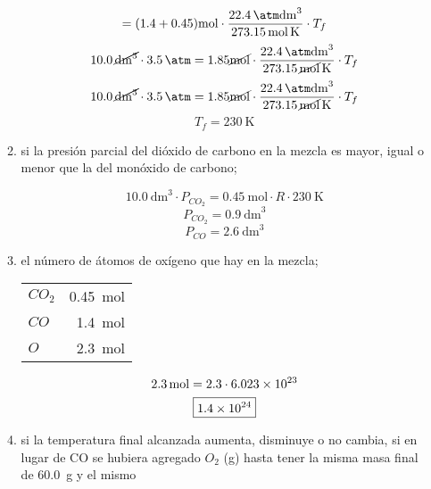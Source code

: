\documentclass[../practica.root.tex]{subfiles}
\begin{document}
\begin{enumerate}
\begin{enumerate}
\begin{center}
\[                            = (\num{1,4} + \num{0,45})\si{\mole}
                            \cdot\frac{\SI{22,4}{\atm\dm\cubed}}{\SI{273,15}{\mole\kelvin}}
                            \cdot T_f
                        \]
                        \[
                            \SI{10,0}{\cancel\dm\cubed}\cdot\SI{3,5}{\cancel\atm}
                            = \num{1,85}\si{\cancel\mole}
                            \cdot\frac{\SI{22,4}{\cancel\atm\cancel\dm\cubed}}{\SI{273,15}{\cancel\mole\kelvin}}
                            \cdot T_f
                        \]
                        \[
                            \SI{10,0}{\cancel\dm\cubed}\cdot\SI{3,5}{\cancel\atm}
                            = \num{1,85}\si{\cancel\mole}
                            \cdot\frac{\SI{22,4}{\cancel\atm\cancel\dm\cubed}}{\SI{273,15}{\cancel\mole\kelvin}}
                            \cdot T_f
                        \]
                        \[ \boxed{T_f = \SI{230}{\kelvin}} \]
                    \end{center}
              \item si la presión parcial del dióxido de carbono en la mezcla es mayor, igual o menor que
                    la del monóxido de carbono;
                    \begin{center}
                        \[ \SI{10,0}{\dm\cubed}\cdot P_{CO_2} = \SI{0,45}{\mole}\cdot R\cdot\SI{230}{\kelvin} \]
                        \[ P_{CO_2} = \SI{0,9}{\dm\cubed} \]
                        \[ P_{CO} = \SI{2,6}{\dm\cubed} \]
                    \end{center}
              \item el número de átomos de oxígeno que hay en la mezcla;
                    \begin{center}
                        \begin{tabular}{ l r }
                            $CO_2$ & \SI{0,45}{\mole} \\
                            $CO$   & \SI{1,4}{\mole}  \\
                            $O$    & \SI{2,3}{\mole}
                        \end{tabular}
                        \[ \SI{2,3}{\mole} = \num{2,3}\cdot\num{6,023E23} \]
                        \[ \boxed{\num{1,4E24}} \]
                    \end{center}
              \item si la temperatura final alcanzada aumenta, disminuye o no cambia, si en lugar de CO
                    se hubiera agregado $O_2$ (g) hasta tener la misma masa final de \SI{60,0}{\gram} y el mismo

\end{enumerate}
\end{enumerate}
\end{document}
